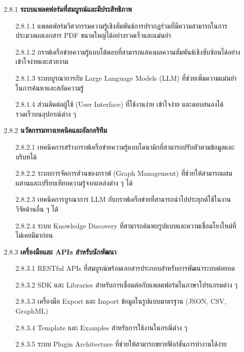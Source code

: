 \documentclass[12pt,a4paper]{article}
\begin{document}
\begin{enumerate}[leftmargin=2cm]
{        \begin{enumerate}
            \item[2.8.1] \textbf{ระบบแพลตฟอร์มที่สมบูรณ์และมีประสิทธิภาพ}
            \begin{enumerate}
                \item[2.8.1.1] แพลตฟอร์มวิศวกรรมความรู้เชิงสัมพันธ์การปรากฏร่วมที่มีความสามารถในการประมวลผลเอกสาร PDF ขนาดใหญ่ได้อย่างรวดเร็วและแม่นยำ
                \item[2.8.1.2] กราฟเครือข่ายความรู้แบบโต้ตอบที่สามารถแสดงผลความสัมพันธ์เชิงซับซ้อนได้อย่างเข้าใจง่ายและสวยงาม
                \item[2.8.1.3] ระบบบูรณาการกับ Large Language Models (LLM) ที่ช่วยเพิ่มความแม่นยำในการค้นหาและสกัดความรู้
                \item[2.8.1.4] ส่วนติดต่อผู้ใช้ (User Interface) ที่ใช้งานง่าย เข้าใจง่าย และตอบสนองได้รวดเร็วบนอุปกรณ์ต่าง ๆ
            \end{enumerate}

            \item[2.8.2] \textbf{นวัตกรรมทางเทคนิคและอัลกอริทึม}
            \begin{enumerate}
                \item[2.8.2.1] เทคนิคการสร้างกราฟเครือข่ายความรู้แบบไดนามิกที่สามารถปรับตัวตามข้อมูลและบริบทได้
                \item[2.8.2.2] ระบบการจัดการส่วนของกราฟ (Graph Management) ที่ช่วยให้สามารถผสมผสานและเปรียบเทียบความรู้จากแหล่งต่าง ๆ ได้
                \item[2.8.2.3] เทคนิคการบูรณาการ LLM กับกราฟเครือข่ายที่สามารถนำไปประยุกต์ใช้ในงานวิจัยด้านอื่น ๆ ได้
                \item[2.8.2.4] ระบบ Knowledge Discovery ที่สามารถค้นพบรูปแบบและความเชื่อมโยงใหม่ที่ไม่เคยมีมาก่อน
            \end{enumerate}

            \item[2.8.3] \textbf{เครื่องมือและ APIs สำหรับนักพัฒนา}
            \begin{enumerate}
                \item[2.8.3.1] RESTful APIs ที่สมบูรณ์พร้อมเอกสารประกอบสำหรับการพัฒนาระบบต่อยอด
                \item[2.8.3.2] SDK และ Libraries สำหรับการเชื่อมต่อกับแพลตฟอร์มในภาษาโปรแกรมต่าง ๆ
                \item[2.8.3.3] เครื่องมือ Export และ Import ข้อมูลในรูปแบบมาตรฐาน (JSON, CSV, GraphML)
                \item[2.8.3.4] Template และ Examples สำหรับการใช้งานในกรณีต่าง ๆ
                \item[2.8.3.5] ระบบ Plugin Architecture ที่ช่วยให้สามารถขยายฟังก์ชันการทำงานได้ง่าย
            \end{enumerate}
        \end{enumerate}

}
\end{enumerate}
\end{document}
